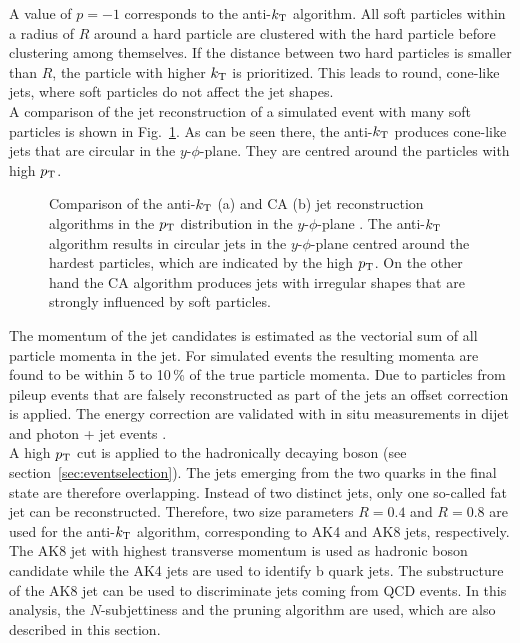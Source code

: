 \noindent A value of $p=-1$ corresponds to the anti-$k_{\rm T}$ algorithm. All soft particles within a radius of $R$ around a hard particle are clustered with the hard particle before clustering among themselves. If the distance between two hard particles is smaller than $R$, the particle with higher $k_{\rm T}$ is prioritized. This leads to round, cone-like jets, where soft particles do not affect the jet shapes.\\

\noindent A comparison of the jet reconstruction of a simulated event with many soft particles is shown in Fig.~\ref{fig:eventreco:jet_reco}. As can be seen there, the anti-$k_{\rm T}$ produces cone-like jets that are circular in the $y$-$\phi$-plane. They are centred around the particles with high $p_{\rm T}$.\\
\begin{figure}
	\centering
	\caption[Comparison of the anti-$k_{\rm T}$ and CA jet reconstruction algorithms]{Comparison of the anti-$k_{\rm T}$ (a) and CA (b) jet reconstruction algorithms in the $p_{\rm T}$ distribution in the $y$-$\phi$-plane \cite{antikt}. The anti-$k_{\rm T}$ algorithm results in circular jets in the $y$-$\phi$-plane centred around the hardest particles, which are indicated by the high $p_{\rm T}$. On the other hand the CA algorithm produces jets with irregular shapes that are strongly influenced by soft particles.}
	\label{fig:eventreco:jet_reco}
\end{figure}

\noindent The momentum of the jet candidates is estimated as the vectorial sum of all particle momenta in the jet. For simulated events the resulting momenta are found to be within 5 to 10\,\% of the true particle momenta. Due to particles from pileup events that are falsely reconstructed as part of the jets an offset correction is applied. The energy correction are validated with in situ measurements in dijet and photon + jet events \cite{jetcorrection}.\\

\noindent A high $p_{\rm T}$ cut is applied to the hadronically decaying boson (see section~\ref{sec:eventselection}). The jets emerging from the two quarks in the final state are therefore overlapping. Instead of two distinct jets, only one so-called fat jet can be reconstructed. Therefore, two size parameters $R=0.4$ and $R=0.8$ are used for the anti-$k_{\rm T}$ algorithm, corresponding to AK4 and AK8 jets, respectively. The AK8 jet with highest transverse momentum is used as hadronic boson candidate while the AK4 jets are used to identify b quark jets. The substructure of the AK8 jet can be used to discriminate jets coming from QCD events. In this analysis, the $N$-subjettiness and the pruning algorithm are used, which are also described in this section.

